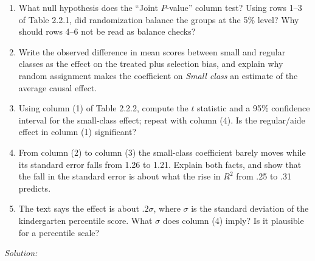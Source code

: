 \documentclass[11pt,a4paper]{article}
\newif\ifsolucoes
\newcommand{\espacoresol}{4.5cm}   %
\newcommand{\resolespaco}{\ifsolucoes\else\par\textit{Solution:}\vspace{\espacoresol}\par\fi}
\begin{document}
\begin{enumerate}[label=(\alph*)]
\item What null hypothesis does the ``Joint $P$-value'' column test? Using rows 1--3 of Table 2.2.1,
did randomization balance the groups at the 5\% level? Why should rows 4--6 not be read as balance checks?
\item Write the observed difference in mean scores between small and regular classes as the effect on
the treated plus selection bias, and explain why random assignment makes the coefficient on
\emph{Small class} an estimate of the average causal effect.
\item Using column (1) of Table 2.2.2, compute the $t$ statistic and a 95\% confidence interval for the
small-class effect; repeat with column (4). Is the regular/aide effect in column (1) significant?
\item From column (2) to column (3) the small-class coefficient barely moves while its standard error
falls from 1.26 to 1.21. Explain both facts, and show that the fall in the standard error is about what
the rise in $R^2$ from .25 to .31 predicts.
\item The text says the effect is about $.2\sigma$, where $\sigma$ is the standard deviation of the
kindergarten percentile score. What $\sigma$ does column (4) imply? Is it plausible for a percentile scale?
\end{enumerate}
\resolespaco
\end{document}

